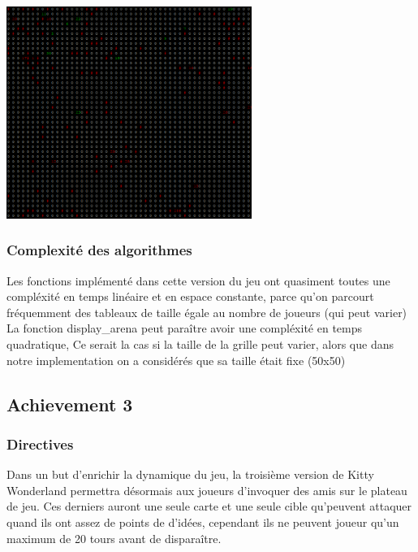 \documentclass[a4paper]{article}
\begin{document}
\begin{enumerate}
\begin{itemize}
\begin{center}
\includegraphics[width=0.6\textwidth]{arena}\\[1cm]
\end{center}
\end{itemize}

\end{enumerate}

\newpage
\subsubsection{Complexité des algorithmes}
Les fonctions implémenté dans cette version du jeu ont quasiment toutes une compléxité en temps linéaire et en espace constante, parce qu'on parcourt fréquemment des tableaux de taille égale au nombre de joueurs (qui peut varier) \\

La fonction display\_arena peut paraître avoir une compléxité en temps quadratique, Ce serait la cas si la taille de la grille peut varier, alors que dans notre implementation on a considérés que sa taille était fixe (50x50) 

\newpage
\subsection{Achievement 3}
\subsubsection{Directives}
Dans un but d’enrichir la dynamique du jeu, la troisième version de Kitty Wonderland permettra désormais aux joueurs d’invoquer des amis sur le plateau de jeu. Ces derniers auront une seule carte et une seule cible qu'peuvent attaquer quand ils ont assez de points de d'idées, cependant ils ne peuvent joueur qu’un maximum de 20 tours avant de disparaître.\\
\end{document}
